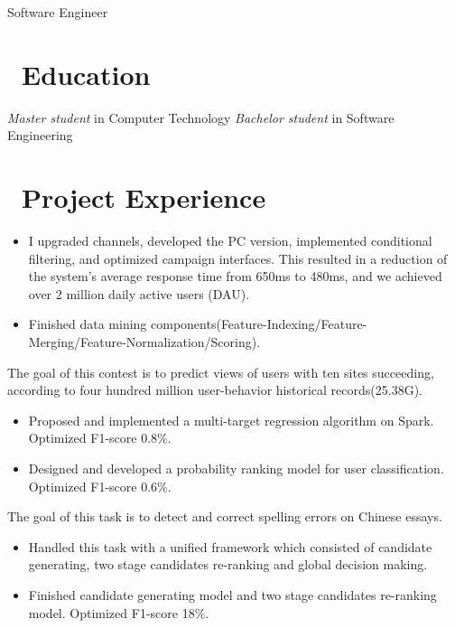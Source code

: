 \documentclass{resume}
\begin{document}

\centerline{Software Engineer}
\vspace{2ex}

 
\section{\faGraduationCap\ Education}
\textit{Master student} in Computer Technology
\textit{Bachelor student} in Software Engineering


\section{\faUsers\ Project Experience}
\begin{itemize}
  \item I upgraded channels, developed the PC version, implemented conditional filtering, and optimized campaign interfaces. This resulted in a reduction of the system's average response time from 650ms to 480ms, and we achieved over 2 million daily active users (DAU).
  \item Finished data mining components(Feature-Indexing/Feature-Merging/Feature-Normalization/Scoring).
\end{itemize}


The goal of this contest is to predict views of users with ten sites succeeding, according to four hundred million user-behavior historical records(25.38G).
\begin{itemize}
  \item Proposed and implemented a multi-target regression algorithm on Spark. Optimized F1-score 0.8\%.
  \item Designed and developed a probability ranking model for user classification. Optimized F1-score  0.6\%.
\end{itemize}

The goal of this task is to detect and correct spelling errors on Chinese essays.
\begin{itemize}
  \item Handled this task with a unified framework which consisted of candidate generating, two stage candidates re-ranking and global decision making.
  \item Finished candidate generating model and two stage candidates re-ranking model. Optimized F1-score 18\%.
\end{itemize}
\end{document}
